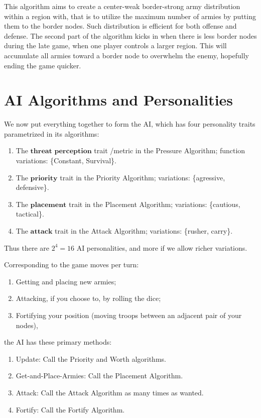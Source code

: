 \documentclass[12pt]{article}  %
\begin{document}
This algorithm aims to create a center-weak border-strong army distribution within a region with, that is to utilize the maximum number of armies by putting them to the border nodes. Such distribution is efficient for both offense and defense. The second part of the algorithm kicks in when there is less border nodes during the late game, when one player controls a larger region. This will accumulate all armies toward a border node to overwhelm the enemy, hopefully ending the game quicker.







\section{AI Algorithms and Personalities}

We now put everything together to form the AI, which has four personality traits parametrized in its algorithms: 

\begin{enumerate}
	\item The $\textbf{threat perception}$ trait /metric in the Pressure Algorithm; function variations: \{Constant, Survival\}.
	\item The $\textbf{priority}$ trait in the Priority Algorithm; variations: \{agressive, defensive\}.
	\item The $\textbf{placement}$ trait in the Placement Algorithm; variations: \{cautious, tactical\}.
	\item The $\textbf{attack}$ trait in the Attack Algorithm; variations: \{rusher, carry\}.
\end{enumerate}

Thus there are $2^4 = 16$ AI personalities, and more if we allow richer variations.


Corresponding to the game moves per turn:
\begin{enumerate}
\item Getting and placing new armies;
\item Attacking, if you choose to, by rolling the dice; 
\item Fortifying your position (moving troops between an adjacent pair of your nodes),
\end{enumerate}

the AI has these primary methods:
\begin{enumerate}
\item Update: Call the Priority and Worth algorithms.
\item Get-and-Place-Armies: Call the Placement Algorithm.
\item Attack: Call the Attack Algorithm as many times as wanted.
\item Fortify: Call the Fortify Algorithm.
\end{enumerate}
\end{document}
